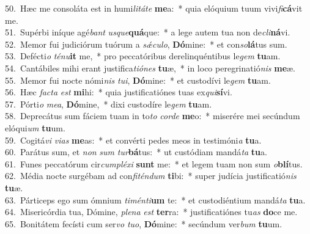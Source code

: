 {50.~}Hæc me consoláta est in humi\textit{li}\textit{tá}\textit{te} \textbf{me}a:~* quia elóquium tuum vivi\textit{fi}\textbf{cá}vit me.\\
{51.~}Supérbi iníque agé\textit{bant} \textit{us}\textit{que}\textbf{quá}que:~* a lege autem tua non de\textit{cli}\textbf{ná}vi.\\
{52.~}Memor fui judiciórum tuórum a \textit{sǽ}\textit{cu}\textit{lo}, \textbf{Dó}mine:~* et con\textit{so}\textbf{lá}tus sum.\\
{53.~}Defécti\textit{o} \textit{té}\textit{nu}\textbf{it} me,~* pro peccatóribus derelinquéntibus le\textit{gem} \textbf{tu}am.\\
{54.~}Cantábiles mihi erant justifica\textit{ti}\textit{ó}\textit{nes} \textbf{tu}æ,~* in loco peregrinatió\textit{nis} \textbf{me}æ.\\
{55.~}Memor fui nocte nómi\textit{nis} \textit{tu}\textit{i}, \textbf{Dó}mine:~* et custodívi le\textit{gem} \textbf{tu}am.\\
{56.~}Hæc \textit{fa}\textit{cta} \textit{est} \textbf{mi}hi:~* quia justificatiónes tuas ex\textit{qui}\textbf{sí}vi.\\
{57.~}Pórti\textit{o} \textit{me}\textit{a}, \textbf{Dó}mine,~* dixi custodíre le\textit{gem} \textbf{tu}am.\\
{58.~}Deprecátus sum fáciem tuam in to\textit{to} \textit{cor}\textit{de} \textbf{me}o:~* miserére mei secúndum elóqui\textit{um} \textbf{tu}um.\\
{59.~}Cogitá\textit{vi} \textit{vi}\textit{as} \textbf{me}as:~* et convérti pedes meos in testimóni\textit{a} \textbf{tu}a.\\
{60.~}Parátus sum, et \textit{non} \textit{sum} \textit{tur}\textbf{bá}tus:~* ut custódiam mandá\textit{ta} \textbf{tu}a.\\
{61.~}Funes peccatórum cir\textit{cum}\textit{plé}\textit{xi} \textbf{sunt} me:~* et legem tuam non sum \textit{o}\textbf{blí}tus.\\
{62.~}Média nocte surgébam ad con\textit{fi}\textit{tén}\textit{dum} \textbf{ti}bi:~* super judícia justificatió\textit{nis} \textbf{tu}æ.\\
{63.~}Párticeps ego sum ómnium \textit{ti}\textit{mén}\textit{ti}\textbf{um} te:~* et custodiéntium mandá\textit{ta} \textbf{tu}a.\\
{64.~}Misericórdia tua, Dómine, \textit{ple}\textit{na} \textit{est} \textbf{ter}ra:~* justificatiónes tu\textit{as} \textbf{do}ce me.\\
{65.~}Bonitátem fecísti cum ser\textit{vo} \textit{tu}\textit{o}, \textbf{Dó}mine:~* secúndum ver\textit{bum} \textbf{tu}um.\\

